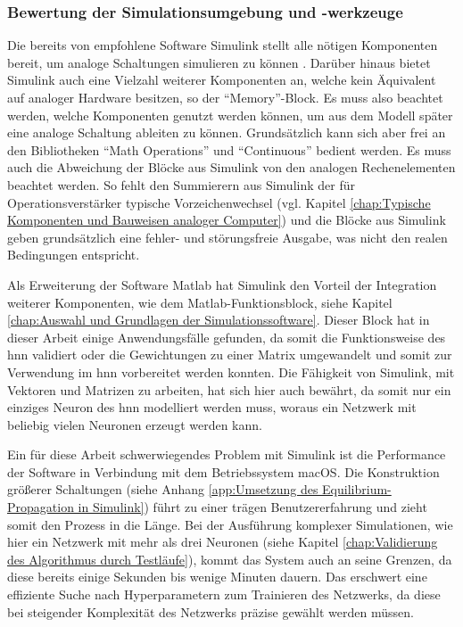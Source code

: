 \subsubsection{Bewertung der Simulationsumgebung und -werkzeuge}
\label{chap:Bewertung der Simulationsumgebung und -werkzeuge}

Die bereits von \citeauthor{Ulmann2022} empfohlene Software Simulink stellt alle nötigen Komponenten bereit, um analoge Schaltungen simulieren zu können \cite[vgl. S. 240]{Ulmann2022}. Darüber hinaus bietet Simulink auch eine Vielzahl weiterer Komponenten an, welche kein Äquivalent auf analoger Hardware besitzen, so \zb der "`Memory"'-Block. Es muss also beachtet werden, welche Komponenten genutzt werden können, um aus dem Modell später eine analoge Schaltung ableiten zu können. Grundsätzlich kann sich aber frei an den Bibliotheken "`Math Operations"' und "`Continuous"' bedient werden. Es muss auch die Abweichung der Blöcke aus Simulink von den analogen Rechenelementen beachtet werden. So fehlt \zb den Summierern aus Simulink der für Operationsverstärker typische Vorzeichenwechsel (vgl. Kapitel \ref{chap:Typische Komponenten und Bauweisen analoger Computer}) und die Blöcke aus Simulink geben grundsätzlich eine fehler- und störungsfreie Ausgabe, was nicht den realen Bedingungen entspricht.

Als Erweiterung der Software Matlab hat Simulink den Vorteil der Integration weiterer Komponenten, wie dem Matlab-Funktionsblock, siehe Kapitel \ref{chap:Auswahl und Grundlagen der Simulationssoftware}. Dieser Block hat in dieser Arbeit einige Anwendungsfälle gefunden, da somit \zb die Funktionsweise des \ac{hnn} validiert oder die Gewichtungen zu einer Matrix umgewandelt und somit zur Verwendung im \ac{hnn} vorbereitet werden konnten. Die Fähigkeit von Simulink, mit Vektoren und Matrizen zu arbeiten, hat sich hier auch bewährt, da somit nur ein einziges Neuron des \ac{hnn} modelliert werden muss, woraus ein Netzwerk mit beliebig vielen Neuronen erzeugt werden kann.

Ein für diese Arbeit schwerwiegendes Problem mit Simulink ist die Performance der Software in Verbindung mit dem Betriebssystem macOS. Die Konstruktion größerer Schaltungen (siehe \zb Anhang \ref{app:Umsetzung des Equilibrium-Propagation in Simulink}) führt zu einer trägen Benutzererfahrung und zieht somit den Prozess in die Länge. Bei der Ausführung komplexer Simulationen, wie hier ein Netzwerk mit mehr als drei Neuronen (siehe Kapitel \ref{chap:Validierung des Algorithmus durch Testläufe}), kommt das System auch an seine Grenzen, da diese bereits einige Sekunden bis wenige Minuten dauern. Das erschwert \zb eine effiziente Suche nach Hyperparametern zum Trainieren des Netzwerks, da diese bei steigender Komplexität des Netzwerks präzise gewählt werden müssen.
